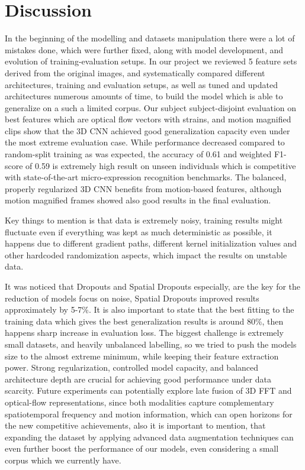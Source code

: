 \documentclass{article}
\begin{document}
\section{Discussion }
In the beginning of the modelling and datasets manipulation there were a lot of mistakes done, which were further fixed, along with model development, and evolution of training-evaluation setups. In our project we reviewed 5 feature sets derived from the original images, and systematically compared different architectures, training and evaluation setups, as well as tuned and updated architectures numerous amounts of time, to build the model which is able to generalize on a such a limited corpus. Our subject subject-disjoint evaluation on best features which are optical flow vectors with strains, and motion magnified clips show that the 3D CNN achieved good generalization capacity even under the most extreme evaluation case. While performance decreased compared to random-split training as was expected, the accuracy of 0.61 and weighted F1-score of 0.59 is extremely high result on unseen individuals which is competitive with state-of-the-art micro-expression recognition benchmarks. The balanced, properly regularized 3D CNN benefits from motion-based features, although motion magnified frames showed also good results in the final evaluation.

Key things to mention is that data is extremely noisy, training results might fluctuate even if everything was kept as much deterministic as possible, it happens due to different gradient paths, different kernel initialization values and other hardcoded randomization aspects, which impact the results on unstable data.

It was noticed that Dropouts and Spatial Dropouts especially, are the key for the reduction of models focus on noise, Spatial Dropouts improved results approximately by 5-7\%. It is also important to state that the best fitting to the training data which gives the best generalization results is around 80\%, then happens sharp increase in evaluation loss. The biggest challenge is extremely small datasets, and heavily unbalanced labelling, so we tried to push the models size to the almost extreme minimum, while keeping their feature extraction power. Strong regularization, controlled model capacity, and balanced architecture depth are crucial for achieving good performance under data scarcity. Future experiments can potentially explore late fusion of 3D FFT and optical-flow representations, since both modalities capture complementary spatiotemporal frequency and motion information, which can open horizons for the new competitive achievements, also it is important to mention, that expanding the dataset by applying advanced data augmentation techniques can even further boost the performance of our models, even considering a small corpus which we currently have.
\end{document}
